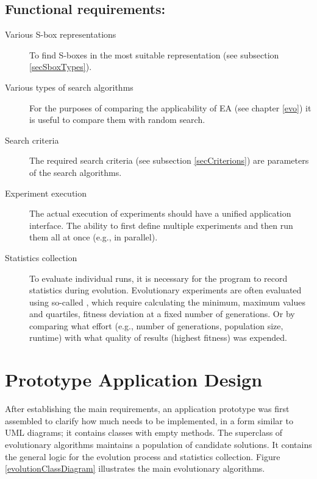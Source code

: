 \subsection*{Functional requirements:}
\begin{description}
  \item[Various S-box representations] To find S-boxes in the most suitable representation (see subsection \ref{secSboxTypes}).

  \item[Various types of search algorithms] For the purposes of comparing the applicability of EA (see chapter \ref{evo})
  it is useful to compare them with random search.

  \item[Search criteria] The required search criteria (see subsection \ref{secCriterions})
  are parameters of the search algorithms.

  \item[Experiment execution] The actual execution of experiments should have a unified application interface.
  The ability to first define multiple experiments and then run them all at once (e.g., in parallel).

  \item[Statistics collection] To evaluate individual runs, it is necessary for the program to record statistics during evolution.
  Evolutionary experiments are often evaluated using so-called , which require calculating
  the minimum, maximum values and quartiles, fitness deviation at a fixed number of generations.
  Or \cite{millerThomson} by comparing what effort (e.g., number of generations, population size, runtime) with what quality of results (highest fitness)
  was expended.
\end{description}

\section{Prototype Application Design}
After establishing the main requirements, an application prototype was first assembled
to clarify how much needs to be implemented,
in a form similar to UML diagrams; it contains classes with empty methods.
The superclass of evolutionary algorithms maintains a population of candidate solutions. It contains the general logic for
the evolution process and statistics collection. Figure \ref{evolutionClassDiagram} illustrates the main evolutionary
algorithms.


